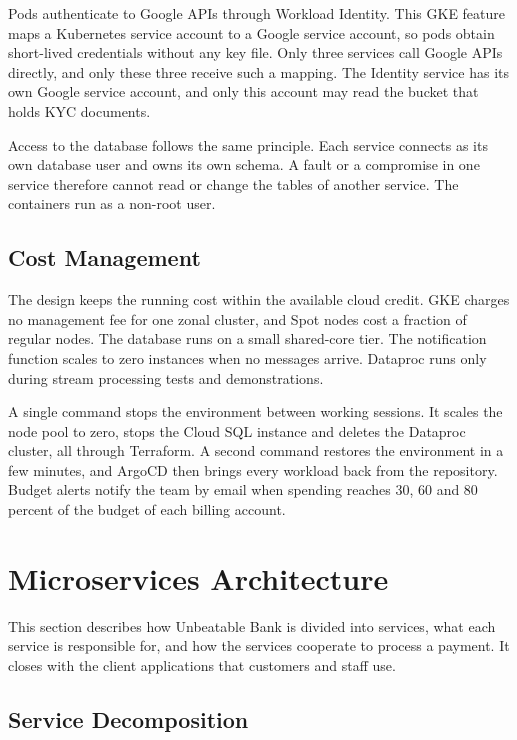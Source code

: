 \documentclass[11pt,a4paper]{article}
\newcommand{\project}{Unbeatable Bank}
\begin{document}
Pods authenticate to Google APIs through Workload Identity. This GKE feature maps a Kubernetes service account to a Google service account, so pods obtain short-lived credentials without any key file. Only three services call Google APIs directly, and only these three receive such a mapping. The Identity service has its own Google service account, and only this account may read the bucket that holds KYC documents.

Access to the database follows the same principle. Each service connects as its own database user and owns its own schema. A fault or a compromise in one service therefore cannot read or change the tables of another service. The containers run as a non-root user.

\subsection{Cost Management}
\label{sec:cost}

The design keeps the running cost within the available cloud credit. GKE charges no management fee for one zonal cluster, and Spot nodes cost a fraction of regular nodes. The database runs on a small shared-core tier. The notification function scales to zero instances when no messages arrive. Dataproc runs only during stream processing tests and demonstrations.

A single command stops the environment between working sessions. It scales the node pool to zero, stops the Cloud SQL instance and deletes the Dataproc cluster, all through Terraform. A second command restores the environment in a few minutes, and ArgoCD then brings every workload back from the repository. Budget alerts notify the team by email when spending reaches 30, 60 and 80 percent of the budget of each billing account.

\section{Microservices Architecture}
\label{sec:microservices}

This section describes how \project{} is divided into services, what each service is responsible for, and how the services cooperate to process a payment. It closes with the client applications that customers and staff use.

\subsection{Service Decomposition}
\label{sec:decomposition}
\end{document}
